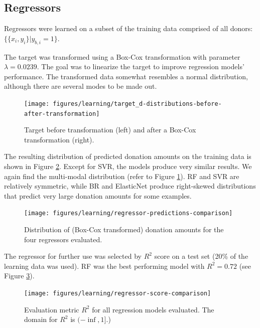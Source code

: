 \documentclass[
  11pt,
  a4paper,
  DIV=12,captions=tableheading,oneside,titlepage]{scrbook}
\begin{document}
\hypertarget{regressors-1}{%
\subsection{Regressors}\label{regressors-1}}

Regressors were learned on a subset of the training data comprised of all donors: \(\{\{x_i, y_i\}|y_{b,i} = 1\}\).

The target was transformed using a Box-Cox transformation with parameter \(\lambda=0.0239\). The goal was to linearize the target to improve regression models' performance. The transformed data somewhat resembles a normal distribution, although there are several modes to be made out.

\begin{figure}

{\centering \texttt{[image: figures/learning/target\_d-distributions-before-after-transformation]} 

}

\caption{Target before transformation (left) and after a Box-Cox transformation (right).}\label{fig:reg-targ-transform}
\end{figure}

The resulting distribution of predicted donation amounts on the training data is shown in Figure \ref{fig:reg-distrib}. Except for SVR, the models produce very similar results. We again find the multi-modal distribution (refer to Figure \ref{fig:reg-targ-transform}). RF and SVR are relatively symmetric, while BR and ElasticNet produce right-skewed distributions that predict very large donation amounts for some examples.



\begin{figure}
 
 {\centering \texttt{[image: figures/learning/regressor-predictions-comparison]} 
 
 }
 
 \caption{Distribution of (Box-Cox transformed) donation amounts for the four regressors evaluated.}\label{fig:reg-distrib}
 \end{figure}

The regressor for further use was selected by \(R^2\) score on a test set (20\% of the learning data was used). RF was the best performing model with \(R^2 = 0.72\) (see Figure \ref{fig:reg-eval}).



\begin{figure}

{\centering \texttt{[image: figures/learning/regressor-score-comparison]} 

}

\caption{Evaluation metric \(R^2\) for all regression models evaluated. The domain for \(R^2\) is \((-\inf, 1]\).)}\label{fig:reg-eval}
\end{figure}
\end{document}
